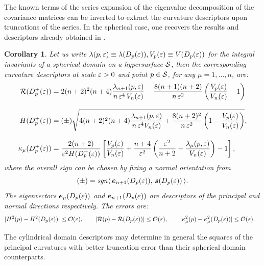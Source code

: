 \documentclass[letterpaper, reqno, 11pt]{amsart}
\newtheorem{corollary}[theorem]{Corollary}
\theoremstyle{definition}
\theoremstyle{remark}
\numberwithin{equation}{section}
\begin{document}
The known terms of the series expansion of the eigenvalue decomposition of the covariance matrices can be inverted to extract the curvature descriptors upon truncations of the series. In the spherical case, one recovers the results and descriptors already obtained in \cite{alvarez2018a}.

\begin{corollary}
	Let us write $\lambda(p,\varepsilon)\equiv\lambda(D_p(\varepsilon)), V_p(\varepsilon)\equiv V(D_p(\varepsilon))$ for the integral invariants of a spherical domain on a hypersurface ${\mathcal S}$, then the corresponding curvature descriptors at scale $\varepsilon>0$ and point $p\in{\mathcal S}$, for any $\mu=1,\dots,n$, are:
\begin{align}
	\mathcal{R}(D^+_p(\varepsilon)) & = 2(n+2)^2(n+4)\frac{\lambda_{n+1}(p,\varepsilon)}{n\,\varepsilon^4\, V_n(\varepsilon)} - \frac{8(n+1)(n+2)}{n\,\varepsilon^2}\left(\frac{V_p(\varepsilon)}{V_n(\varepsilon)} - 1 \right) \\[3mm]
	H(D^+_p(\varepsilon)) & = (\pm)\sqrt{ 4(n+2)^2(n+4)\frac{\lambda_{n+1}(p,\varepsilon)}{n\,\varepsilon^4 V_n(\varepsilon)} +\frac{8(n+2)^2}{n\,\varepsilon^2}\left(1-\frac{V_p(\varepsilon)}{V_n(\varepsilon)} \right) }, \\[3mm]
	\kappa_\mu(D^+_p(\varepsilon)) & = \frac{2(n+2)}{\varepsilon^2 H(D^+_p(\varepsilon))}\left[ \frac{V_p(\varepsilon)}{V_n(\varepsilon)}+\frac{n+4}{\varepsilon^2}\left( \frac{\varepsilon^2}{n+2}-\frac{\lambda_\mu(p,\varepsilon)}{V_n(\varepsilon)} \right) -1 \right],
\end{align}
where the overall sign can be chosen by fixing a normal orientation from $$(\pm)=\text{\emph{sgn}}\langle\,\boldsymbol{e}_{n+1}(D_p(\varepsilon)),\,\boldsymbol{s}(D_p(\varepsilon))\,\rangle .$$ The eigenvectors $\boldsymbol{e}_\mu(D_p(\varepsilon))$ and $\boldsymbol{e}_{n+1}(D_p(\varepsilon))$ are descriptors of the principal and normal directions respectively. The errors are:
\begin{align*}
	& |H^2(p)-H^2(D_p(\varepsilon))|\leq{\mathcal O}(\varepsilon), \qquad |\mathcal{R}(p)-\mathcal{R}(D_p(\varepsilon)) |\leq{\mathcal O}(\varepsilon), \qquad |\kappa^2_\mu(p)-\kappa^2_\mu(D_p(\varepsilon))|\leq{\mathcal O}(\varepsilon).
\end{align*}
\end{corollary}

The cylindrical domain descriptors may determine in general the squares of the principal curvatures with better truncation error than their spherical domain counterparts.
\end{document}
